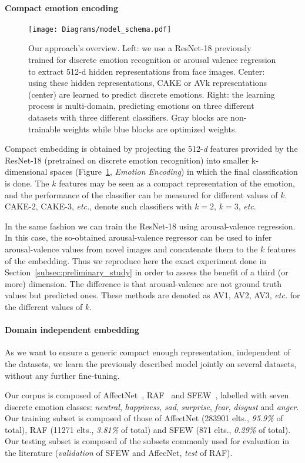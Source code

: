 \documentclass{bmvc2k}
\begin{document}
\paragraph{Compact emotion encoding}
\begin{figure}
    \centering
    \texttt{[image: Diagrams/model\_schema.pdf]}
    \caption{Our approach's overview. Left: we use a ResNet-18 previously trained for discrete emotion recognition or arousal valence regression to extract 512-d hidden representations from face images. Center: using these hidden representations, CAKE or AVk representations (center) are learned to predict discrete emotions. Right: the learning process is multi-domain, predicting emotions on three different datasets with three different classifiers. Gray blocks are non-trainable weights while blue blocks are optimized weights.}
    \label{fig:cross_arch}
\end{figure}
Compact embedding is obtained by projecting the 512-\textit{d} features provided by the ResNet-18 (pretrained on discrete emotion recognition) into smaller k-dimensional spaces (Figure~\ref{fig:cross_arch}, \textit{Emotion Encoding}) in which the final classification is done.
The $k$ features may be seen as a compact representation of the emotion, and the performance of the classifier can be measured for different values of $k$. CAKE-2, CAKE-3, \textit{etc.}, denote such classifiers with $k=2$, $k=3$, \textit{etc}.

In the same fashion we can train the ResNet-18 using arousal-valence regression. In this case, the so-obtained arousal-valence regressor can be used to infer arousal-valence values from novel images and concatenate them to the $k$ features of the embedding. Thus we reproduce here the exact experiment done in Section~\ref{subsec:preliminary_study} in order to assess the benefit of a third (or more) dimension. The difference is that arousal-valence are not ground truth values but predicted ones. These methods are denoted as AV1, AV2, AV3, \textit{etc.} for the different values of $k$.

\paragraph{Domain independent embedding}
As we want to ensure a generic compact enough representation, independent of the datasets, we learn the previously described model jointly on several datasets, without any further fine-tuning.

Our corpus is composed of AffectNet~\cite{mollahosseini_affectnet:_2017}, RAF~\cite{li_reliable_2017} and SFEW~\cite{dhall_static_2011}, labelled with seven discrete emotion classes: \textit{neutral}, \textit{happiness}, \textit{sad}, \textit{surprise}, \textit{fear}, \textit{disgust} and \textit{anger}. Our training subset is composed of those of AffectNet (283901 elts., \textit{95.9\%} of total), RAF (11271 elts., \textit{3.81\%} of total) and SFEW (871 elts., \textit{0.29\%} of total). Our testing subset is composed of the subsets commonly used for evaluation in the literature (\textit{validation} of SFEW and AffecNet, \textit{test} of RAF).
\end{document}
